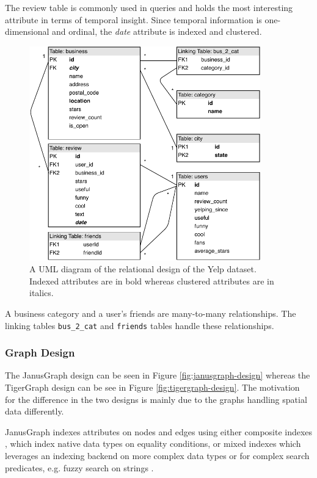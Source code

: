 The review table is commonly used in queries and holds the most interesting attribute in terms of temporal insight. Since temporal information is one-dimensional and ordinal, the \emph{date} attribute is indexed and clustered.

\begin{figure}[h!]
    \centering
    \includegraphics[width=10cm]{img/relational-design.pdf}
    \caption{A UML diagram of the relational design of the Yelp dataset. Indexed attributes are in bold whereas clustered attributes are in italics.}
    \label{fig:relational-design}
\end{figure}

A business category and a user's friends are many-to-many relationships. The linking tables \texttt{bus\_2\_cat} and \texttt{friends} tables handle these relationships.

\subsubsection{Graph Design}

The JanusGraph design can be seen in Figure \ref{fig:janusgraph-design} whereas the TigerGraph design can be see in Figure \ref{fig:tigergraph-design}. The motivation for the difference in the two designs is mainly due to the graphs handling spatial data differently.

JanusGraph indexes attributes on nodes and edges using either composite indexes \cite{janusgraph-comp-index}, which index native data types on equality conditions, or mixed indexes which leverages an indexing backend on more complex data types or for complex search predicates, e.g. fuzzy search on strings \cite{janusgraph-mixed-index}.

